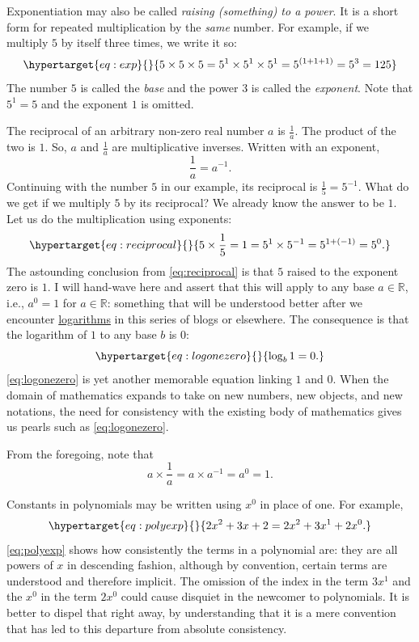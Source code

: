 \documentclass[
  a4paper,
]{article}
\begin{document}
Exponentiation may also be called \emph{raising (something) to a power}.
It is a short form for repeated multiplication by the \emph{same}
number. For example, if we multiply \(5\) by itself three times, we
write it so: \begin{equation}\protect\hypertarget{eq:exp}{}{
5\times5\times5 = 5^1\times5^1\times5^1 = 5^{(1+1+1)} = 5^{3} = 125
}\label{eq:exp}\end{equation} The number \(5\) is called the \emph{base}
and the power \(3\) is called the \emph{exponent}. Note that \(5^1 = 5\)
and the exponent \(1\) is omitted.

The reciprocal of an arbitrary non-zero real number \(a\) is
\(\frac{1}{a}\). The product of the two is \(1\). So, \(a\) and
\(\frac{1}{a}\) are multiplicative inverses. Written with an exponent,
\[
\frac{1}{a} = a^{-1}.
\] Continuing with the number \(5\) in our example, its reciprocal is
\(\frac{1}{5} = 5^{-1}\). What do we get if we multiply \(5\) by its
reciprocal? We already know the answer to be \(1\). Let us do the
multiplication using exponents:
\begin{equation}\protect\hypertarget{eq:reciprocal}{}{
5 \times \frac{1}{5} = 1 = 5^{1} \times 5^{-1} = 5^{1+(-1)} = 5^{0}.
}\label{eq:reciprocal}\end{equation} The astounding conclusion from
\cref{eq:reciprocal} is that \(5\) raised to the exponent zero is
\({1}\). I will hand-wave here and assert that this will apply to any
base \(a \in \mathbb{R}\), i.e., \(a^0 = 1\) for \(a \in \mathbb{R}\):
something that will be understood better after we encounter
\href{https://www.britannica.com/science/logarithm}{logarithms} in this
series of blogs or elsewhere. The consequence is that the logarithm of
\(1\) to any base \(b\) is \(0\):
\begin{equation}\protect\hypertarget{eq:logonezero}{}{
\log_{b}1 = 0.
}\label{eq:logonezero}\end{equation} \cref{eq:logonezero} is yet another
memorable equation linking \(1\) and \(0\). When the domain of
mathematics expands to take on new numbers, new objects, and new
notations, the need for consistency with the existing body of
mathematics gives us pearls such as \cref{eq:logonezero}.

From the foregoing, note that \[
a \times \frac{1}{a} = a \times a^{-1} = a^0 = 1.
\]

Constants in polynomials may be written using \(x^0\) in place of one.
For example, \begin{equation}\protect\hypertarget{eq:polyexp}{}{
2x^2 + 3x + 2 = 2x^2 + 3x^1 + 2x^0.
}\label{eq:polyexp}\end{equation} \cref{eq:polyexp} shows how
consistently the terms in a polynomial are: they are all powers of \(x\)
in descending fashion, although by convention, certain terms are
understood and therefore implicit. The omission of the index in the term
\(3x^1\) and the \(x^0\) in the term \(2x^0\) could cause disquiet in
the newcomer to polynomials. It is better to dispel that right away, by
understanding that it is a mere convention that has led to this
departure from absolute consistency.
\end{document}
